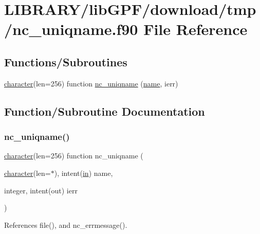 \hypertarget{nc__uniqname_8f90}{}\section{L\+I\+B\+R\+A\+R\+Y/lib\+G\+P\+F/download/tmp/nc\+\_\+uniqname.f90 File Reference}
\label{nc__uniqname_8f90}
\subsection*{Functions/\+Subroutines}
\begin{DoxyCompactItemize}
\item 
\hyperlink{option__stopwatch_83_8txt_abd4b21fbbd175834027b5224bfe97e66}{character}(len=256) function \hyperlink{nc__uniqname_8f90_a0a9bfa958469b0b0415ecb52d36bdb92}{nc\+\_\+uniqname} (\hyperlink{M__stopwatch_83_8txt_a3f508a893ae4c3b397b4383e33b9bcae}{name}, ierr)
\end{DoxyCompactItemize}


\subsection{Function/\+Subroutine Documentation}
\mbox{\label{nc__uniqname_8f90_a0a9bfa958469b0b0415ecb52d36bdb92}} 
\subsubsection{\texorpdfstring{nc\+\_\+uniqname()}{nc\_uniqname()}}
{\footnotesize\ttfamily \hyperlink{option__stopwatch_83_8txt_abd4b21fbbd175834027b5224bfe97e66}{character}(len=256) function nc\+\_\+uniqname (\begin{DoxyParamCaption}\item[{\hyperlink{option__stopwatch_83_8txt_abd4b21fbbd175834027b5224bfe97e66}{character}(len=$\ast$), intent(\hyperlink{M__journal_83_8txt_afce72651d1eed785a2132bee863b2f38}{in})}]{name,  }\item[{integer, intent(out)}]{ierr }\end{DoxyParamCaption})}



References file(), and nc\+\_\+errmessage().

